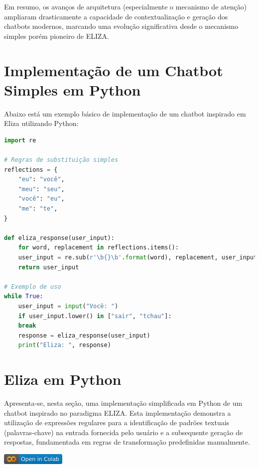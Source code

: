\documentclass[14pt,a4paper,oneside]{book}
\begin{document}
Em resumo, os avanços de arquitetura (especialmente o mecanismo de atenção) ampliaram drasticamente a capacidade de contextualização e geração dos chatbots modernos, marcando uma evolução significativa desde o mecanismo simples porém pioneiro de ELIZA.

\section{Implementação de um Chatbot Simples em Python}

Abaixo está um exemplo básico de implementação de um chatbot inspirado em Eliza utilizando Python:

\begin{lstlisting}[language=Python, caption=Exemplo simples do Eliza,label=lst:eliza_chatbot]
import re

# Regras de substituição simples
reflections = {
	"eu": "você",
	"meu": "seu",
	"você": "eu",
	"me": "te",
}

def eliza_response(user_input):
	for word, replacement in reflections.items():
	user_input = re.sub(r'\b{}\b'.format(word), replacement, user_input)
	return user_input

# Exemplo de uso
while True:
	user_input = input("Você: ")
	if user_input.lower() in ["sair", "tchau"]:
	break
	response = eliza_response(user_input)
	print("Eliza: ", response)
\end{lstlisting}

\section{Eliza em Python}

Apresenta-se, nesta seção, uma implementação simplificada em Python de um chatbot inspirado no paradigma ELIZA. 
Esta implementação demonstra a utilização de expressões regulares para a identificação de padrões textuais (palavras-chave) na entrada fornecida pelo usuário e a subsequente geração de respostas, fundamentada em regras de transformação predefinidas manualmente.

\vspace{\baselineskip}
\href{https://colab.research.google.com/github/giseldo/chatbotbook/blob/main/notebook/eliza.ipynb}{
  \includegraphics{./fig/colab-badge.png}
}
\end{document}
